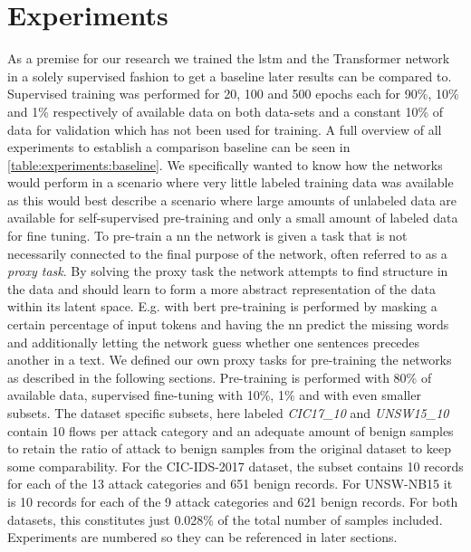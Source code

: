 \chapter{Experiments}\label{sec:experiments}


As a premise for our research we trained the \gls{lstm} and the Transformer network in a solely supervised fashion to get a baseline later results can be compared to. Supervised training was performed for 20, 100 and 500 epochs each for 90\%, 10\% and 1\% respectively of available data on both data-sets and a constant 10\% of data for validation which has not been used for training. A full overview of all experiments to establish a comparison baseline can be seen in \ref{table:experiments:baseline}. We specifically wanted to know how the networks would perform in a scenario where very little labeled training data was available as this would best describe a scenario where large amounts of unlabeled data are available for self-supervised pre-training and only a small amount of labeled data for fine tuning. To pre-train a \gls{nn} the network is given a task that is not necessarily connected to the final purpose of the network, often referred to as a \textit{proxy task}. By solving the proxy task the network attempts to find structure in the data and should learn to form a more abstract representation of the data within its latent space. E.g. with \gls{bert} pre-training is performed by masking a certain percentage of input tokens and having the \gls{nn} predict the missing words and additionally letting the network guess whether one sentences precedes another in a text. We defined our own proxy tasks for pre-training the networks as described in the following sections. Pre-training is performed with 80\% of available data, supervised fine-tuning with 10\%, 1\% and with even smaller subsets.
The dataset specific subsets, here labeled \textit{CIC17\_10} and \textit{UNSW15\_10} contain 10 flows per attack category and an adequate amount of benign samples to retain the ratio of attack to benign samples from the original dataset to keep some comparability. For the CIC-IDS-2017 dataset, the subset contains 10 records for each of the 13 attack categories and 651 benign records. For UNSW-NB15 it is 10 records for each of the 9 attack categories and 621 benign records. For both datasets, this constitutes just 0.028\% of the total number of samples included. Experiments are numbered so they can be referenced in later sections.

